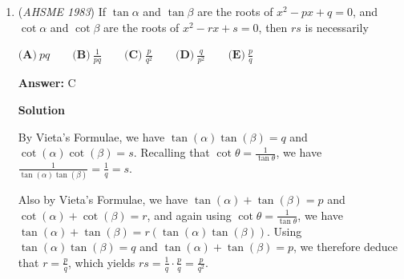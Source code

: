 \begin{enumerate}
 \textbf{Answer: }A



\textbf{Solution 1 (Law of Cosines)}

Let $AD = y$. Since $AD$ bisects $\angle{BAC}$, the Angle Bisector Theorem gives $\frac{DB}{CD} = \frac{AB}{AC} = 2$, so let $CD = x$ and $DB = 2x$. Applying the Law of Cosines to $\triangle CAD$ gives $x^2 = 3^2 + y^2 - 3y$, and to $\triangle DAB$ gives $(2x)^2 = 6^2 + y^2 - 6y$. Subtracting $4$ times the first equation from the second equation therefore yields $0 = 6y - 3y^2 \Rightarrow y(y-2) = 0$, so $y$ is $0$ or $2$. But since $y \neq 0$ ($y$ is the length of a side of a triangle), $y$ must be $2$, so the answer is $\boxed{\textbf{(A)} \ 2}$.

 



\textbf{Solution 2 (Similar Triangles)}

Let $E$ be a point on line $AC$ such that $AE = 6$ and $A$ is between $E$ and $C$.  Then $\triangle ABE$ must be equilateral, $BE = 6$, and $\angle BEC = 60^\circ$.  So $BE \parallel DA$ and $\triangle CDA \sim \triangle CBE$.  So $\frac{AD}{6} = \frac{3}{9}$, so $AD = \boxed{(\mathbf{A})\ 2}$.

 -j314andrews

 


	\item (\textit{AHSME 1983}) If $\tan{\alpha}$ and $\tan{\beta}$ are the roots of $x^2 - px + q = 0$, and $\cot{\alpha}$ and $\cot{\beta}$
are the roots of $x^2 - rx + s = 0$, then $rs$ is necessarily 


 $\textbf{(A)} \ pq \qquad  \textbf{(B)} \ \frac{1}{pq} \qquad  \textbf{(C)} \ \frac{p}{q^2} \qquad  \textbf{(D)}\ \frac{q}{p^2}\qquad \textbf{(E)}\ \frac{p}{q}$

 \textbf{Answer: }C



\textbf{Solution}

By Vieta's Formulae, we have $\tan(\alpha)\tan(\beta)=q$ and $\cot(\alpha)\cot(\beta)=s$. Recalling that $\cot\theta=\frac{1}{\tan\theta}$, we have $\frac{1}{\tan(\alpha)\tan(\beta)}=\frac{1}{q}=s$. 

 Also by Vieta's Formulae, we have $\tan(\alpha)+\tan(\beta)=p$ and $\cot(\alpha)+\cot(\beta)=r$, and again using $\cot\theta=\frac{1}{\tan\theta}$, we have $\tan(\alpha)+\tan(\beta)=r(\tan(\alpha)\tan(\beta))$. Using $\tan(\alpha)\tan(\beta)=q$ and $\tan(\alpha)+\tan(\beta)=p$, we therefore deduce that $r=\frac{p}{q}$, which yields $rs = \frac{1}{q}\cdot\frac{p}{q}=\frac{p}{q^2}$.


\end{enumerate}
